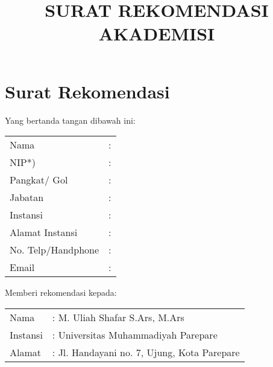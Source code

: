 \documentclass[12pt]{article}
\title{\vspace{-4ex}SURAT REKOMENDASI AKADEMISI}
\author{}
\date{\vspace{-6ex}}
\begin{document}
\begin{comment}

\flushleft{Perihal Permohonan Lamaran Kerja\\ Staff Pengajar/Dosen}


\vspace{\baselineskip}%
{\raggedleft
\begin{tabular}{p{1cm}l@{}}
\vspace{10pt}
&Parepare, \today\\
& Kepada\\
Yth. & Bapak Rektor\\
&Universitas Muhammadiyah\\
&di \\
&Parepare

\end{tabular}\par}

\end{comment}

\section{Surat Rekomendasi}

Yang bertanda tangan dibawah ini:

\begin{table}[htpb]
\renewcommand{\arraystretch}{1.25}
    \begin{tabular}{p{4cm}l}
Nama & :  \\
NIP*) & : \\
Pangkat/ Gol & : \\
Jabatan & : \\
Instansi & : \\
Alamat Instansi & : \\
No. Telp/Handphone &: \\
Email & : \\
    \end{tabular}
\end{table}

Memberi rekomendasi kepada:
\begin{table}[htpb]
    \begin{tabular}{p{4cm}l}
Nama & : M. Uliah Shafar S.Ars, M.Ars\\
Instansi & : Universitas Muhammadiyah Parepare \\
Alamat & : Jl. Handayani no. 7, Ujung, Kota Parepare \\
    \end{tabular}
\end{table}
\end{document}
